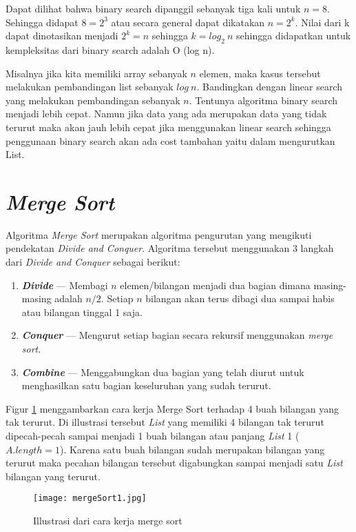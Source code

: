 \documentclass[12pt]{book}%
\begin{document}
Dapat dilihat bahwa binary search dipanggil sebanyak tiga kali untuk $n = 8$. Sehingga didapat $8 = 2^{3}$ atau secara general dapat dikatakan $n = 2^{k}$.  Nilai dari k dapat dinotasikan menjadi $2^{k} = n$ sehingga $k = log_2\ n$ sehingga didapatkan untuk kempleksitas dari binary search adalah  O (log n).

Misalnya jika kita memiliki array sebanyak $n$ elemen, maka kasus tersebut melakukan pembandingan list sebanyak $log\ n$. Bandingkan dengan linear search yang  melakukan pembandingan sebanyak $n$. Tentunya algoritma binary search menjadi lebih cepat. Namun jika data yang ada merupakan data yang tidak terurut maka akan jauh lebih cepat jika menggunakan linear search sehingga penggunaan binary search akan ada cost tambahan yaitu dalam mengurutkan List.

\section{\textit{Merge Sort}}
Algoritma \textit{Merge Sort} merupakan algoritma pengurutan yang mengikuti pendekatan \textit{Divide and Conquer}. Algoritma tersebut menggunakan 3 langkah dari \textit{Divide and Conquer} sebagai berikut:
\begin{enumerate}
\item \textbf{\textit{Divide}} --- Membagi $n$ elemen/bilangan menjadi dua bagian dimana masing-masing adalah $n/2$. Setiap $n$ bilangan akan terus dibagi dua sampai habis atau bilangan tinggal 1 saja.
\item \textbf{\textit{Conquer}} --- Mengurut setiap bagian secara rekursif menggunakan \textit{merge sort}. 
\item \textbf{\textit{Combine}} --- Menggabungkan dua bagian yang telah diurut untuk menghasilkan satu bagian keseluruhan yang sudah terurut.
\end{enumerate}

Figur \ref{fig:mergeSortIllustration} menggambarkan cara kerja Merge Sort terhadap 4 buah bilangan yang tak terurut. Di illustrasi tersebut \textit{List} yang memiliki 4 bilangan tak terurut dipecah-pecah sampai menjadi 1 buah bilangan atau panjang \textit{List} 1 ($A.length = 1$). Karena satu buah bilangan sudah merupakan bilangan yang terurut maka pecahan bilangan tersebut digabungkan sampai menjadi satu \textit{List} bilangan yang terurut. 

\begin{figure}[htbp]
\begin{center}
	\texttt{[image: mergeSort1.jpg]}%
	\caption{Illustrasi dari cara kerja merge sort}%
	\label{fig:mergeSortIllustration}%
\end{center}
\end{figure}
\end{document}
